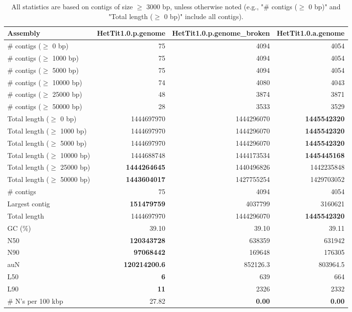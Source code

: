 \documentclass[12pt,a4paper]{article}
\begin{document}
\begin{table}[ht]
\begin{center}
\caption{All statistics are based on contigs of size $\geq$ 3000 bp, unless otherwise noted (e.g., "\# contigs ($\geq$ 0 bp)" and "Total length ($\geq$ 0 bp)" include all contigs).}
\begin{tabular}{|l*{3}{|r}|}
\hline
Assembly & HetTit1.0.p.genome & HetTit1.0.p.genome\_broken & HetTit1.0.a.genome \\ \hline
\# contigs ($\geq$ 0 bp) & 75 & 4094 & 4054 \\ \hline
\# contigs ($\geq$ 1000 bp) & 75 & 4094 & 4054 \\ \hline
\# contigs ($\geq$ 5000 bp) & 75 & 4094 & 4054 \\ \hline
\# contigs ($\geq$ 10000 bp) & 74 & 4080 & 4043 \\ \hline
\# contigs ($\geq$ 25000 bp) & 48 & 3874 & 3871 \\ \hline
\# contigs ($\geq$ 50000 bp) & 28 & 3533 & 3529 \\ \hline
Total length ($\geq$ 0 bp) & 1444697970 & 1444296070 & {\bf 1445542320} \\ \hline
Total length ($\geq$ 1000 bp) & 1444697970 & 1444296070 & {\bf 1445542320} \\ \hline
Total length ($\geq$ 5000 bp) & 1444697970 & 1444296070 & {\bf 1445542320} \\ \hline
Total length ($\geq$ 10000 bp) & 1444688748 & 1444173534 & {\bf 1445445168} \\ \hline
Total length ($\geq$ 25000 bp) & {\bf 1444264645} & 1440496826 & 1442235848 \\ \hline
Total length ($\geq$ 50000 bp) & {\bf 1443604017} & 1427755254 & 1429703052 \\ \hline
\# contigs & 75 & 4094 & 4054 \\ \hline
Largest contig & {\bf 151479759} & 4037799 & 3160621 \\ \hline
Total length & 1444697970 & 1444296070 & {\bf 1445542320} \\ \hline
GC (\%) & 39.10 & 39.10 & 39.11 \\ \hline
N50 & {\bf 120343728} & 638359 & 631942 \\ \hline
N90 & {\bf 97068442} & 169648 & 176305 \\ \hline
auN & {\bf 120214200.6} & 852126.3 & 803964.5 \\ \hline
L50 & {\bf 6} & 639 & 664 \\ \hline
L90 & {\bf 11} & 2326 & 2332 \\ \hline
\# N's per 100 kbp & 27.82 & {\bf 0.00} & {\bf 0.00} \\ \hline
\end{tabular}
\end{center}
\end{table}
\end{document}
